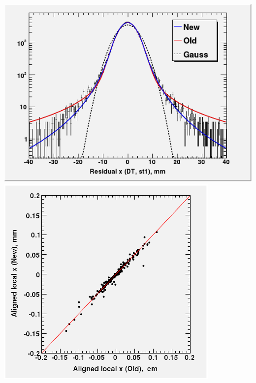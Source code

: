 \documentclass[compress]{beamer}
\begin{document}
\begin{frame}
\begin{columns}
\includegraphics[width=\linewidth]{residuals_fit_functions.png}
\includegraphics[width=\linewidth]{correlation_new_old.png}
\end{columns}
\end{frame}
\end{document}
